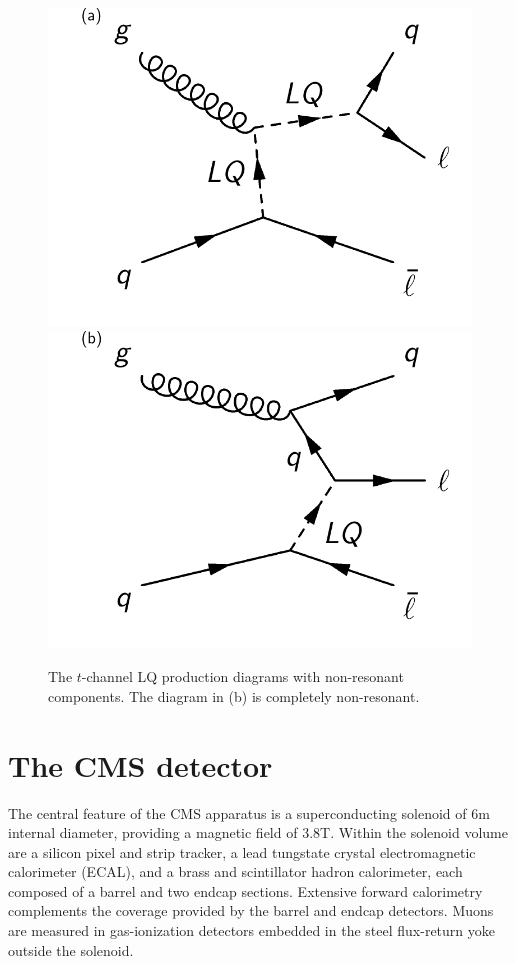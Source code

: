 \begin{figure}[!h]
       \centering       
       \includegraphics[scale=.45]{Figures/Figures_tchannel1.pdf} 
       \includegraphics[scale=.45]{Figures/Figures_tchannel2.pdf} 
       \caption{The $t$-channel LQ production diagrams with non-resonant components.  The diagram in (b) is completely non-resonant.
	 \label{figapp:NonResDiagram}}
\end{figure}

\section{The CMS detector}
\label{cms}

The central feature of the CMS apparatus is a superconducting solenoid of 6\unit{m} internal diameter, providing a magnetic field of 3.8\unit{T}.  Within the solenoid volume are a silicon pixel and strip tracker, a lead tungstate crystal electromagnetic calorimeter (ECAL), and a brass and scintillator hadron calorimeter, each composed of a barrel and two endcap sections.  Extensive forward calorimetry complements the coverage provided by the barrel and endcap detectors.  Muons are measured in gas-ionization detectors embedded in the steel flux-return yoke outside the solenoid. 

